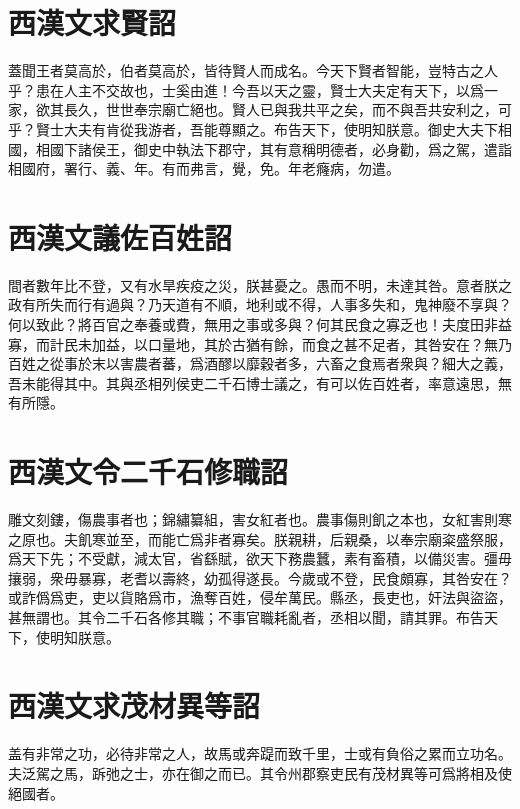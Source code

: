 \section[高帝求賢詔\quad{\small 西漢文}]{{\normalsize 西漢文}\quad {}求賢詔}
蓋聞王者莫高於，伯者莫高於，皆待賢人而成名。今天下賢者智能，豈特古之人乎？患在人主不交故也，士奚由進！今吾以天之靈，賢士大夫定有天下，以爲一家，欲其長久，世世奉宗廟亡絕也。賢人已與我共平之矣，而不與吾共安利之，可乎？賢士大夫有肯從我游者，吾能尊顯之。布告天下，使明知朕意。御史大夫下相國，相國下諸侯王，御史中執法下郡守，其有意稱明德者，必身勸，爲之駕，遣詣相國府，署行、義、年。有而弗言，覺，免。年老癃病，勿遣。 

\section[文帝議佐百姓詔\quad{\small 西漢文}]{{\normalsize 西漢文}\quad {}議佐百姓詔}
間者數年比不登，又有水旱疾疫之災，朕甚憂之。愚而不明，未達其咎。意者朕之政有所失而行有過與？乃天道有不順，地利或不得，人事多失和，鬼神廢不享與？何以致此？將百官之奉養或費，無用之事或多與？何其民食之寡乏也！夫度田非益寡，而計民未加益，以口量地，其於古猶有餘，而食之甚不足者，其咎安在？無乃百姓之從事於末以害農者蕃，爲酒醪以靡穀者多，六畜之食焉者衆與？細大之義，吾未能得其中。其與丞相列侯吏二千石博士議之，有可以佐百姓者，率意遠思，無有所隱。

\section[景帝令二千石修職詔\quad{\small 西漢文}]{{\normalsize 西漢文}\quad {}令二千石修職詔}
雕文刻鏤，傷農事者也；錦繡纂組，害女紅者也。農事傷則飢之本也，女紅害則寒之原也。夫飢寒並至，而能亡爲非者寡矣。朕親耕，后親桑，以奉宗廟粢盛祭服，爲天下先；不受獻，減太官，省繇賦，欲天下務農蠶，素有畜積，以備災害。彊毋攘弱，衆毋暴寡，老耆以壽終，幼孤得遂長。今歲或不登，民食頗寡，其咎安在？或詐僞爲吏，吏以貨賂爲市，漁奪百姓，侵牟萬民。縣丞，長吏也，奸法與盜盜，甚無謂也。其令二千石各修其職；不事官職耗亂者，丞相以聞，請其罪。布告天下，使明知朕意。

\theendnotes

\section[武帝求茂材異等詔\quad{\small 西漢文}]{{\normalsize 西漢文}\quad {}求茂材異等詔}
盖有非常之功，必待非常之人，故馬或奔踶而致千里，士或有負俗之累而立功名。夫泛駕之馬，跅弛之士，亦在御之而已。其令州郡察吏民有茂材異等可爲將相及使絕國者。 

